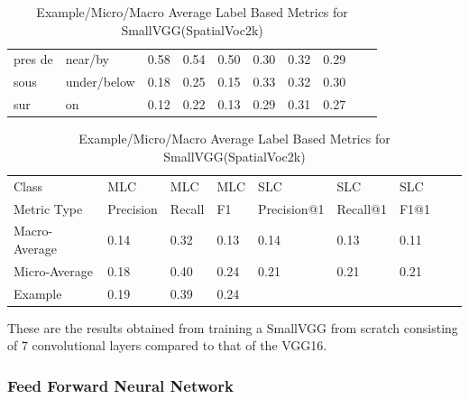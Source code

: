 \documentclass{csfyp}
\begin{document}
\begin{table}[!htbp]
\begin{tabular}{|l|l|l|l|l|l|l|l|l|l}
pres de	&	near/by	&	0.58	&	0.54	&	0.50	&	0.30	&	0.32	&	0.29 \\ \cline{1-8}
sous	&	under/below	&	0.18	&	0.25	&	0.15	&	0.33	&	0.32	&	0.30 \\ \cline{1-8}
sur	&	on	&	0.12	&	0.22	&	0.13	&	0.29	&	0.31	&	0.27 \\ \cline{1-8}
\end{tabular}
\caption{SmallVGG(SpatialVoc2k) results for MLC and SLC}
\centering
\begin{tabular}{|l|l|l|l|l|l|l|l|l}
\cline{1-7}
Class &  MLC  &  MLC  &  MLC & SLC &  SLC & SLC \\ \cline{1-7}
Metric Type   & Precision &  Recall & F1 & Precision@1 & Recall@1 & F1@1 \\ \cline{1-7}
Macro-Average &	0.14	&	0.32	&	0.13	&	0.14	&	0.13	&	0.11 \\ \cline{1-7}
Micro-Average &	0.18	&	0.40	&	0.24	&	0.21	&	0.21	&	0.21 \\ \cline{1-7}
Example       &	0.19	&	0.39	&	0.24  \\ \cline{1-4}
\end{tabular}
\caption{Example/Micro/Macro Average Label Based Metrics for SmallVGG(SpatialVoc2k)}
These are the results obtained from training a SmallVGG from scratch consisting of 7 convolutional layers compared to that of the VGG16.
\vspace{-4mm}
\end{table}

\newpage
\subsubsection{Feed Forward Neural Network}
\end{document}
